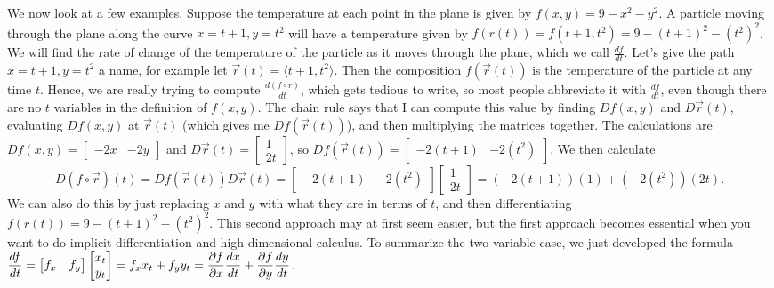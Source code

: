 We now look at a few examples. Suppose the temperature at each point
in the plane is given by {$f(x,y) = 9-x^2-y^2$}.  A particle moving
through the plane along the curve $x=t+1, y=t^2$ will have a
temperature given by $f(r(t)) = f(t+1,t^2) = 9-(t+1)^2-(t^2)^2$.  We
will find the rate of change of the temperature of the particle as it
moves through the plane, which we call {$\frac{df}{dt}$}. Let's give
the path $x=t+1, y=t^2$ a name, for example let {$\vec r(t) =
  \langle t+1,t^2\rangle$}.  Then the composition {$f(\vec r(t))$} is
the temperature of the particle at any time {$t$}.  Hence, we are
really trying to compute {$\frac{d(f\circ r)}{dt}$}, which gets tedious to
write, so most people abbreviate it with {$\frac{df}{dt}$}, even
though there are no {$t$} variables in the definition of {$f(x,y)$}.  The
chain rule says that I can compute this value by finding {$Df(x,y)$}
and {$D\vec r(t)$}, evaluating {$Df(x,y)$} at {$\vec r(t)$} (which
gives me {$Df(\vec r(t))$}), and then multiplying the matrices
together. The calculations are $Df(x,y) = \begin{bmatrix}-2x &
  -2y\end{bmatrix}$ and $D\vec r(t) = \begin{bmatrix}1\\
  2t\end{bmatrix}$, so $Df(\vec r(t)) =
\begin{bmatrix}-2(t+1) & -2(t^2)\end{bmatrix}$. We then calculate 
$$D(f\circ \vec r)(t) = Df(\vec r(t))D\vec r(t)=\begin{bmatrix}-2(t+1) &
  -2(t^2)\end{bmatrix} \begin{bmatrix}1\\ 2t\end{bmatrix}=
(-2(t+1))(1) + (-2(t^2))(2t).$$ We can also do this by just replacing
{$x$} and {$y$} with what they are in terms of $t$, and then
differentiating $f(r(t)) = 9-(t+1)^2-(t^2)^2$.  This second approach
may at first seem easier, but the first approach becomes essential
when you want to do implicit differentiation and high-dimensional
calculus.  To summarize the two-variable case, we just developed the
formula $\displaystyle \frac{df}{dt}=\begin{bmatrix}f_x &
  f_y\end{bmatrix} \begin{bmatrix}x_t\\ y_t\end{bmatrix}=f_xx_t+f_yy_t
= \frac{\partial f}{\partial x}\frac{dx}{dt}+\frac{\partial f}{\partial y}\frac{dy}{dt}$.

